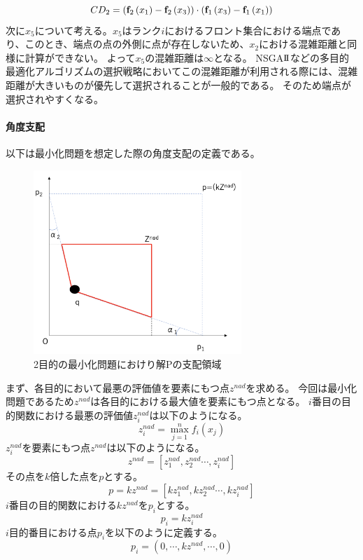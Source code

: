 \documentclass[10pt, a4paper, titlepage]{jarticle}
\begin{document}
\begin{equation}
CD_2=\left({\bf f}_{2}\left(x_{1}\right)-{\bf f}_{2}\left(x_{3}\right)\right)\cdot\left({\bf f}_{1}\left(x_{3}\right)-{\bf f}_{1}\left(x_{1}\right)\right)
\end{equation}
次に$x_5$について考える。$x_5$はランク$i$におけるフロント集合における端点であり、このとき、端点の点の外側に点が存在しないため、$x_2$における混雑距離と同様に計算ができない。
よって$x_5$の混雑距離は$\infty$となる。
NSGA$\mathrm{I}\hspace{-1.2pt}\mathrm{I}$などの多目的最適化アルゴリズムの選択戦略においてこの混雑距離が利用される際には、混雑距離が大きいものが優先して選択されることが一般的である。
そのため端点が選択されやすくなる。

\paragraph{角度支配}
以下は最小化問題を想定した際の角度支配の定義である。
\begin{figure}[h]
\begin{center}
\includegraphics[width=0.7\textwidth]{angle-dominance.png}
\end{center}
\label{angle-dominance}
\caption{2目的の最小化問題におけり解Pの支配領域}
\end{figure}
まず、各目的において最悪の評価値を要素にもつ点$z^{nad}$を求める。
今回は最小化問題であるため$z^{nad}$は各目的における最大値を要素にもつ点となる。
$i$番目の目的関数における最悪の評価値$z^{nad}_i$は以下のようになる。
\begin{equation}
z^{nad}_{i} = \max^{n}_{j=1} f_i(x_j)
\end{equation}
$z^{nad}_i$を要素にもつ点$z^{nad}$は以下のようになる。
\begin{equation}
z^{nad}=\left[z^{nad}_1,z^{nad}_2 \cdots ,z^{nad}_i\right]
\end{equation}
その点を$k$倍した点を$p$とする。
\begin{equation}
p=kz^{nad}=\left[kz^{nad}_1,kz^{nad}_2 \cdots ,kz^{nad}_i\right]
\end{equation}
$i$番目の目的関数における$kz^{nad}$を$p_i$とする。
\begin{equation}
p_i=kz^{nad}_{i} 
\end{equation}
$i$目的番目における点$p_i$を以下のように定義する。
\begin{equation}
p_i=\left(0,\cdots,kz^{nad},\cdots,0\right)
\end{equation}
\end{document}
